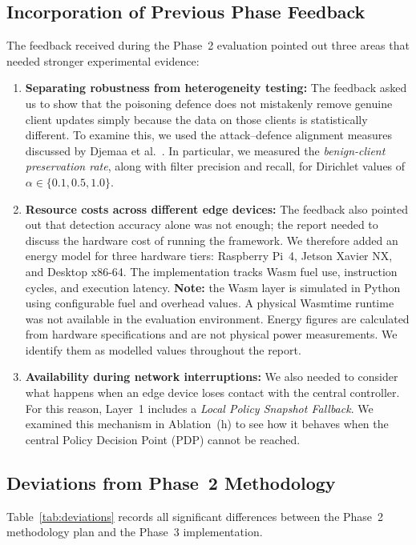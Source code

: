 \documentclass[11pt,a4paper]{article}
\begin{document}
\subsection{Incorporation of Previous Phase Feedback}
The feedback received during the Phase~2 evaluation pointed out three areas that needed stronger experimental evidence:
\begin{enumerate}[leftmargin=1.8em,itemsep=2pt]
    \item \textbf{Separating robustness from heterogeneity testing:} The feedback asked us to show that the poisoning defence does not mistakenly remove genuine client updates simply because the data on those clients is statistically different. To examine this, we used the attack--defence alignment measures discussed by Djemaa et al.~\cite{djemaa2026}. In particular, we measured the \textit{benign-client preservation rate}, along with filter precision and recall, for Dirichlet values of $\alpha \in \{0.1, 0.5, 1.0\}$.
    \item \textbf{Resource costs across different edge devices:} The feedback also pointed out that detection accuracy alone was not enough; the report needed to discuss the hardware cost of running the framework. We therefore added an energy model for three hardware tiers: Raspberry Pi~4, Jetson Xavier NX, and Desktop x86-64. The implementation tracks Wasm fuel use, instruction cycles, and execution latency. \textbf{Note:} the Wasm layer is simulated in Python using configurable fuel and overhead values. A physical Wasmtime runtime was not available in the evaluation environment. Energy figures are calculated from hardware specifications and are not physical power measurements. We identify them as modelled values throughout the report.
    \item \textbf{Availability during network interruptions:} We also needed to consider what happens when an edge device loses contact with the central controller. For this reason, Layer~1 includes a \textit{Local Policy Snapshot Fallback}. We examined this mechanism in Ablation~(h) to see how it behaves when the central Policy Decision Point (PDP) cannot be reached.
\end{enumerate}

\subsection{Deviations from Phase~2 Methodology}
Table~\ref{tab:deviations} records all significant differences between the Phase~2 methodology plan and the Phase~3 implementation.
\end{document}
